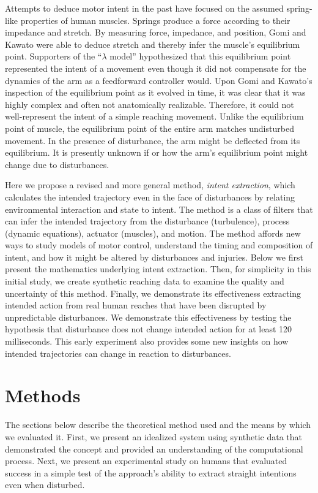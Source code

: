 Attempts to deduce motor intent in the past have focused on the assumed spring-like properties of human muscles. Springs produce a force according to their impedance and stretch. By measuring force, impedance, and position, Gomi and Kawato\cite{gomi1997human} were able to deduce stretch and thereby infer the muscle's equilibrium point. Supporters of the ``$\lambda$ model''\cite{feldman1995origin} hypothesized that this equilibrium point represented the intent of a movement even though it did not compensate for the dynamics of the arm as a feedforward controller would. Upon Gomi and Kawato's inspection of the equilibrium point as it evolved in time, it was clear that it was highly complex and often not anatomically realizable. Therefore, it could not well-represent the intent of a simple reaching movement. Unlike the equilibrium point of muscle, the equilibrium point of the entire arm matches undisturbed movement. In the presence of disturbance, the arm might be deflected from its equilibrium. It is presently unknown if or how the arm's equilibrium point might change due to disturbances. 

Here we propose a revised and more general method, \textit{intent extraction}, which calculates the intended trajectory even in the face of disturbances by relating environmental interaction and state to intent. The method is a class of filters that can infer the intended trajectory from the disturbance (turbulence), process (dynamic equations), actuator (muscles), and motion. The method affords new ways to study models of motor control, understand the timing and composition of intent, and how it might be altered by disturbances and injuries. Below we first present the mathematics underlying intent extraction. Then, for simplicity in this initial study, we create synthetic reaching data to examine the quality and uncertainty of this method. Finally, we demonstrate its effectiveness extracting intended action from real human reaches that have been disrupted by unpredictable disturbances. We demonstrate this effectiveness by testing the hypothesis that disturbance does not change intended action for at least 120 milliseconds. This early experiment also provides some new insights on how intended trajectories can change in reaction to disturbances. 

\section*{Methods}
The sections below describe the theoretical method used and the means by which we evaluated it. First, we present an idealized system using synthetic data that demonstrated the concept and provided an understanding of the computational process. Next, we present an experimental study on humans that evaluated success in a simple test of the approach's ability to extract straight intentions even when disturbed. 

